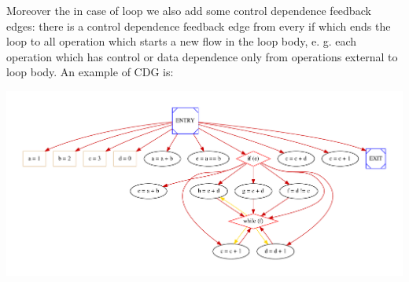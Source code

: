 Moreover the in case of loop we also add some control dependence feedback edges\+: there is a control dependence feedback edge from every if which ends the loop to all operation which starts a new flow in the loop body, e. g. each operation which has control or data dependence only from operations external to loop body. An example of C\+DG is\+: 
\begin{DoxyImageNoCaption}
  \mbox{\includegraphics[width=\textwidth,height=\textheight/2,keepaspectratio=true]{dot_inline_dotgraph_3}}
\end{DoxyImageNoCaption}


